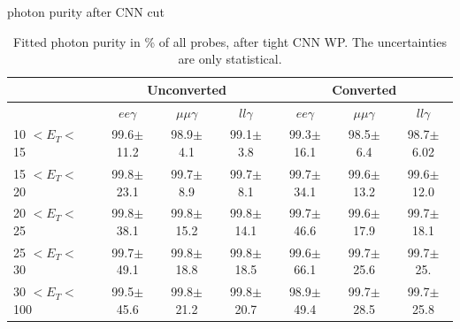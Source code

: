 \begin{frame}{photon purity after CNN cut}
\begin{table}[htbp]
\centering
\begin{tabular}{lcccccc}
\hline\hline
                             & \multicolumn{3}{c}{Unconverted}               & \multicolumn{3}{c}{Converted}                \\
                            \hline

%
                             & $ee\gamma$           & $\mu\mu\gamma$           & $ll\gamma$           & $ee\gamma$           &  $\mu\mu\gamma$          & $ll\gamma$           \\
    \hline
10 $ < E_T < $ 15 & 99.6$\pm$11.2    & 98.9$\pm$4.1       & 99.1$\pm$3.8    & 99.3$\pm$16.1    & 98.5$\pm$6.4     & 98.7$\pm$6.02  \\
15 $ < E_T < $ 20 & 99.8$\pm$23.1    & 99.7$\pm$8.9       & 99.7$\pm$8.1    & 99.7$\pm$34.1    & 99.6$\pm$13.2    & 99.6$\pm$12.0 \\
20 $ < E_T < $ 25 & 99.8$\pm$38.1    & 99.8$\pm$15.2      & 99.8$\pm$14.1   & 99.7$\pm$46.6    & 99.6$\pm$17.9    & 99.7$\pm$18.1  \\
25 $ < E_T < $ 30  & 99.7$\pm$49.1   & 99.8$\pm$18.8      & 99.8$\pm$18.5   & 99.6$\pm$66.1    & 99.7$\pm$25.6    & 99.7$\pm$25.    \\
30 $ < E_T < $ 100 & 99.5$\pm$45.6   & 99.8$\pm$21.2      & 99.8$\pm$20.7   & 98.9$\pm$49.4    & 99.7$\pm$28.5    & 99.7$\pm$25.8     \\
\hline\hline
\end{tabular}
\caption{Fitted photon purity in \%  of all probes, after tight CNN WP. The uncertainties are only statistical.}
\label{tab:gamma:CNN:Zllg:Purity:A}
\end{table}
\end{frame}

